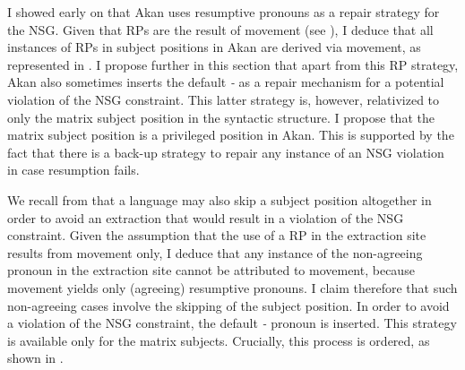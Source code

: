 \documentclass[output=paper]{LSP/langsci}
\begin{document}
 I showed early on  that Akan uses resumptive pronouns as a repair strategy for the NSG. Given that RPs are the result of movement (see ), I deduce that all instances of RPs in subject positions in Akan are derived via movement, as represented in .  I propose further in this section that apart from this RP strategy, Akan also sometimes inserts the default \textit{\eer-} as a repair mechanism for a potential violation of the NSG constraint. This latter strategy is, however, relativized to only the matrix subject position in the syntactic structure. I propose that the matrix subject position is a privileged position in Akan. This is supported by the fact that there is a back-up strategy to repair any instance of an NSG violation in case resumption fails. 
  
  
 We recall from  that a language may also skip a subject position altogether in order to avoid an extraction that would result in a violation of the NSG constraint. Given the assumption that the use of a RP in the extraction site results from movement only, I deduce that any instance of the non-agreeing pronoun in the extraction site cannot be attributed to movement, because movement yields only (agreeing) resumptive pronouns. I claim therefore that such non-agreeing cases involve the skipping of the subject position. In order to avoid a violation of the NSG constraint, the  default \textit{\eer-} pronoun is inserted. This strategy is available only for the matrix subjects. Crucially, this process is ordered, as shown in .
  
\end{document}
